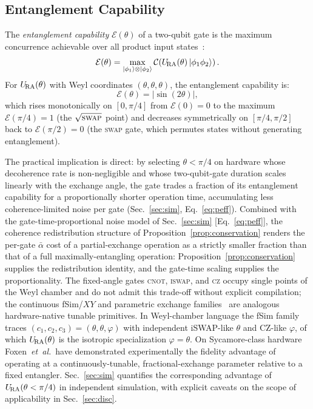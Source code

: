 \subsection{Entanglement Capability}
\label{subsec:entcap}

The \emph{entanglement capability} $\mathcal{E}(\theta)$ of a two-qubit gate
is the maximum concurrence achievable over all product input
states~\cite{Zhang2003WeylChamber}:
\begin{equation}
  \mathcal{E}(\theta) = \max_{\ket{\phi_1}\otimes\ket{\phi_2}}
    \mathcal{C}\!\left(U_{\!\mathrm{RA}}(\theta)\ket{\phi_1\phi_2}\right).
  \label{eq:entcap}
\end{equation}
For $U_{\!\mathrm{RA}}(\theta)$ with Weyl coordinates $(\theta, \theta, \theta)$,
the entanglement capability is:
\begin{equation}
  \mathcal{E}(\theta) = |\sin(2\theta)|,
  \label{eq:entcap-result}
\end{equation}
which rises monotonically on $[0, \pi/4]$ from
$\mathcal{E}(0) = 0$ to the maximum $\mathcal{E}(\pi/4) = 1$
(the $\sqrt{\textsc{swap}}$ point) and decreases symmetrically on
$[\pi/4, \pi/2]$ back to $\mathcal{E}(\pi/2) = 0$ (the \textsc{swap}
gate, which permutes states without generating entanglement).

The practical implication is direct: by selecting $\theta < \pi/4$ on
hardware whose decoherence rate is non-negligible and whose
two-qubit-gate duration scales linearly with the exchange angle, the
gate trades a fraction of its entanglement capability for a
proportionally shorter operation time, accumulating less coherence-limited
noise per gate (Sec.~\ref{sec:sim}, Eq.~\eqref{eq:peff}).
Combined with the gate-time-proportional noise model of
Sec.~\ref{sec:sim} [Eq.~\eqref{eq:peff}], the coherence redistribution
structure of Proposition~\ref{prop:conservation} renders the per-gate
$\bar\alpha$ cost of a partial-exchange operation as a strictly smaller
fraction than that of a full maximally-entangling operation: Proposition~\ref{prop:conservation} supplies the redistribution
identity, and the gate-time scaling supplies the proportionality.
The fixed-angle gates \textsc{cnot}, \textsc{iswap}, and \textsc{cz}
occupy single points of the Weyl chamber and do not admit this
trade-off without explicit compilation; the continuous fSim/$XY$ and
parametric exchange families~\cite{Foxen2020,Abrams2020,Lacroix2020,Caldwell2018}
are analogous hardware-native tunable primitives.
In Weyl-chamber language the fSim family traces
$(c_1,c_2,c_3) = (\theta,\theta,\varphi)$ with independent iSWAP-like
$\theta$ and CZ-like $\varphi$, of which $U_{\!\mathrm{RA}}(\theta)$ is the isotropic
specialization $\varphi = \theta$.
On Sycamore-class hardware
Foxen~\textit{et~al.}\ have demonstrated experimentally the fidelity
advantage of operating at a continuously-tunable, fractional-exchange
parameter relative to a fixed entangler.
Sec.~\ref{sec:sim} quantifies the corresponding advantage of
$U_{\!\mathrm{RA}}(\theta < \pi/4)$ in independent simulation, with explicit caveats
on the scope of applicability in Sec.~\ref{sec:disc}.
